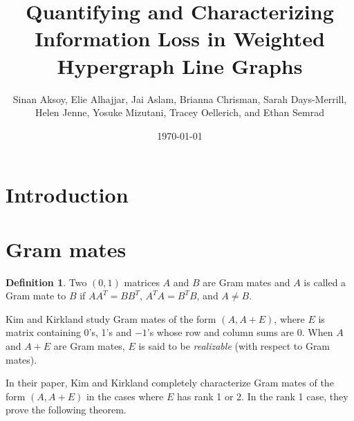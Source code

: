 \documentclass[11pt]{article}
\title{Quantifying and Characterizing Information Loss in Weighted Hypergraph Line Graphs}
\author{Sinan Aksoy, Elie Alhajjar, Jai Aslam, Brianna Chrisman, Sarah Days-Merrill,\\
Helen Jenne, Yosuke Mizutani, Tracey Oellerich, and Ethan Semrad}
\date{\today}
\theoremstyle{definition}
\newtheorem{defn}{Definition}
\theoremstyle{remark}
\begin{document}
\maketitle

\section{Introduction}

\section{Gram mates}

\begin{defn}\cite[Definition 2.1]{Kirkland}
Two $(0, 1)$ matrices $A$ and $B$ are Gram mates and $A$ is called a Gram mate to $B$ if $AA^{T} = BB^{T}$, $A^{T}A = B^{T}B$, and $A \neq B$. 
\end{defn}

Kim and Kirkland study Gram mates of the form $(A, A+E)$, where $E$ is matrix containing 0's, 1's and $-1$'s whose row and column sums are 0. When $A$ and $A+E$ are Gram mates, $E$ is said to be {\em realizable} (with respect to Gram mates). 

In their paper, Kim and Kirkland completely characterize Gram mates of the form $(A, A+E)$ in the cases where $E$ has rank 1 or 2. In the rank 1 case, they prove the following theorem. 
\end{document}
